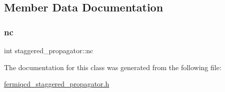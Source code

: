 \subsection{Member Data Documentation}
\mbox{\label{classstaggered__propagator_a1f2816b7b6b4f9b6779224fcdd0d6aff}} 
\subsubsection{\texorpdfstring{nc}{nc}}
{\footnotesize\ttfamily int staggered\+\_\+propagator\+::nc}



The documentation for this class was generated from the following file\+:\begin{DoxyCompactItemize}
\item 
\hyperlink{fermiqcd__staggered__propagator_8h}{fermiqcd\+\_\+staggered\+\_\+propagator.\+h}\end{DoxyCompactItemize}
